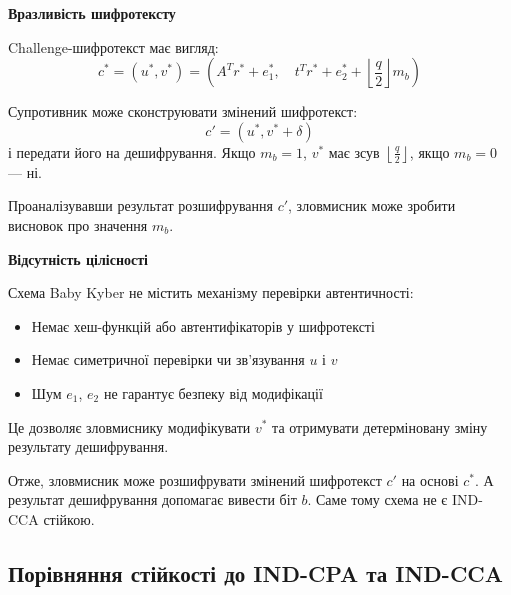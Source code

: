 \textbf{Вразливість шифротексту}

Challenge-шифротекст має вигляд:
\[
c^* = (u^*, v^*) = (A^T r^* + e_1^*,\quad t^T r^* + e_2^* + \left\lfloor \frac{q}{2} \right\rfloor m_b)
\]

Супротивник може сконструювати змінений шифротекст:
\[
c' = (u^*, v^* + \delta)
\]
і передати його на дешифрування. Якщо $m_b = 1$, $v^*$ має зсув $\left\lfloor \frac{q}{2} \right\rfloor$, якщо $m_b = 0$ — ні.

Проаналізувавши результат розшифрування $c'$, зловмисник може зробити висновок про значення $m_b$.

\textbf{Відсутність цілісності}

Схема Baby Kyber не містить механізму перевірки автентичності:

\begin{itemize}
    \item Немає хеш-функцій або автентифікаторів у шифротексті
    \item Немає симетричної перевірки чи зв’язування $u$ і $v$
    \item Шум $e_1$, $e_2$ не гарантує безпеку від модифікації
\end{itemize}

Це дозволяє зловмиснику модифікувати $v^*$ та отримувати детерміновану зміну результату дешифрування.

Отже, зловмисник може розшифрувати змінений шифротекст $c'$ на основі $c^*$. А результат дешифрування допомагає вивести біт $b$. Саме тому схема не є IND-CCA стійкою.



\subsection*{Порівняння стійкості до IND-CPA та IND-CCA}

